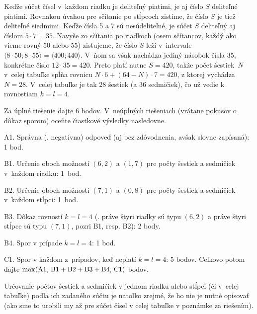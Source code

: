 {Keďže súčet čísel v~každom riadku je deliteľný piatimi, je aj
číslo $S$ deliteľné piatimi. Rovnakou úvahou pre sčítanie po stĺpcoch
zistíme, že číslo $S$ je tiež deliteľné siedmimi.
Keďže čísla 5 a 7 sú nesúdeliteľné, je súčet $S$
deliteľný aj číslom $5\cdot 7=35$. Navyše zo sčítania po riadkoch
(osem sčítancov, každý ako vieme rovný 50 alebo 55) zisťujeme,
že číslo $S$ leží v~intervale
$\langle8\cdot 50;8\cdot 55\rangle=\langle400;440\rangle$.
V~ňom sa však nachádza jediný násobok čísla 35, konkrétne číslo
$12\cdot 35=420$. Preto platí nutne $S=420$, takže počet
šestiek~$N$ v~celej tabuľke spĺňa rovnicu $N\cdot 6 + (64-N)\cdot 7 =
420$, z ktorej vychádza $N= 28$. V~celej tabuľke je tak 28 šestiek
(a 36 sedmičiek), čo už vedie k rovnostiam $k=l=4$.

\schemaABC
Za úplné riešenie dajte 6 bodov. V~neúplných riešeniach (vrátane
pokusov o dôkaz sporom) oceňte čiastkové výsledky nasledovne.
\item{A1.} Správna (\tj. negatívna) odpoveď (aj bez zdôvodnenia, avšak slovne zapísaná): 1 bod.
\item{B1.} Určenie oboch možností $(6,2)$ a $(1,7)$ pre počty šestiek a sedmičiek v~každom riadku: 1~bod.
\item{B2.} Určenie oboch možností $(7,1)$ a $(0,8)$ pre počty šestiek a sedmičiek v~každom stĺpci: 1~bod.
\item{B3.} Dôkaz rovností $k=l=4$ (\tj. práve štyri riadky sú typu $(6,2)$ a práve štyri stĺpce sú typu $(7,1)$, pozri B1, resp. B2): 2 body.
\item{B4.} Spor v prípade $k=l=4$: 1 bod.
\item{C1.} Spor v každom z~prípadov, keď neplatí $k=l=4$: 5 bodov.
\endgraf\noindent
Celkovo potom dajte $\rm\max(A1,\,B1+B2+B3+B4,\,C1)$ bodov.

Určovanie počtov šestiek a sedmičiek v jednom riadku alebo stĺpci (či
v~celej tabuľke) podľa ich zadaného súčtu je natoľko zrejmé, že
ho nie je nutné opisovať (ako sme to urobili my až pre súčet
čísel v celej tabuľke v poznámke za riešením).
\endschema
}

